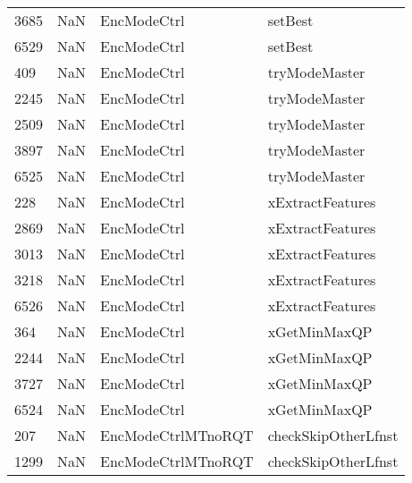 \begin{tabular}{llll}
3685 &                   NaN &                EncModeCtrl &                                   setBest \\
6529 &                   NaN &                EncModeCtrl &                                   setBest \\
409  &                   NaN &                EncModeCtrl &                             tryModeMaster \\
2245 &                   NaN &                EncModeCtrl &                             tryModeMaster \\
2509 &                   NaN &                EncModeCtrl &                             tryModeMaster \\
3897 &                   NaN &                EncModeCtrl &                             tryModeMaster \\
6525 &                   NaN &                EncModeCtrl &                             tryModeMaster \\
228  &                   NaN &                EncModeCtrl &                          xExtractFeatures \\
2869 &                   NaN &                EncModeCtrl &                          xExtractFeatures \\
3013 &                   NaN &                EncModeCtrl &                          xExtractFeatures \\
3218 &                   NaN &                EncModeCtrl &                          xExtractFeatures \\
6526 &                   NaN &                EncModeCtrl &                          xExtractFeatures \\
364  &                   NaN &                EncModeCtrl &                              xGetMinMaxQP \\
2244 &                   NaN &                EncModeCtrl &                              xGetMinMaxQP \\
3727 &                   NaN &                EncModeCtrl &                              xGetMinMaxQP \\
6524 &                   NaN &                EncModeCtrl &                              xGetMinMaxQP \\
207  &                   NaN &         EncModeCtrlMTnoRQT &                       checkSkipOtherLfnst \\
1299 &                   NaN &         EncModeCtrlMTnoRQT &                       checkSkipOtherLfnst \\

\end{tabular}
